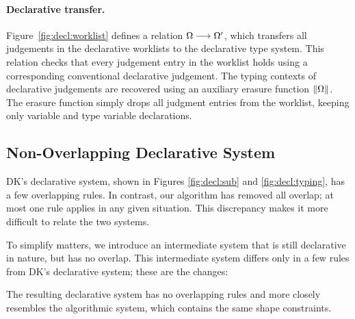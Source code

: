\paragraph{Declarative transfer.}
Figure~\ref{fig:decl:worklist} defines a relation $\Omega \longrightarrow \Omega'$,
which transfers all judgements in the declarative worklists to the
declarative type system. This relation checks that every judgement entry in the worklist
holds using a corresponding conventional declarative judgement. 
The typing contexts of declarative judgements are recovered using an
auxiliary erasure function $\|\Omega\|$. The erasure function
simply drops all judgment entries from the worklist, keeping only variable
and type variable declarations.

\subsection{Non-Overlapping Declarative System}
\label{sec:metatheory:non-overlapping}

DK's declarative system, shown in Figures \ref{fig:decl:sub} and
\ref{fig:decl:typing}, has a few overlapping rules. In contrast, our algorithm
has removed all overlap; at most one rule applies in any given situation.
This discrepancy makes it more difficult to relate the two systems.

To simplify matters, we introduce an intermediate system that is still declarative
in nature, but has no overlap. This intermediate system differs only in a few 
rules from DK's declarative system; these are the changes:
The resulting declarative system has no overlapping rules
and more closely resembles the algorithmic system, which contains
the same shape constraints.


